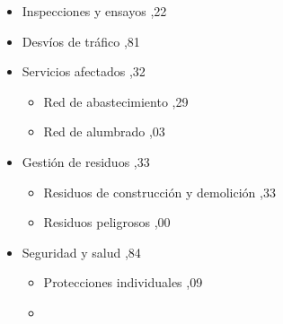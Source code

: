 \documentclass{book}%
\begin{document}
\begin{itemize}
\begin{itemize}
\begin{itemize}
\begin{itemize}
13.772,90%
\item%
Fase 4%
,75%
\end{itemize}%
\item%
Impermeabilización y adecuación del drenaje%
,18%
\begin{itemize}%
\item%
Fase 1%
,69%
\item%
Fase 2%
,03%
\item%
Fase 3%
,76%
\item%
Fase 4%
,70%
\end{itemize}%
\item%
Pavimentos y acabados%
,52%
\begin{itemize}%
\item%
Fase 1%
,71%
\item%
Fase 2%
,09%
\item%
Fase 3%
,97%
\item%
Fase 4%
,82%
\item%
Cuñas de transición%
,93%
\end{itemize}%
\item%
Marcas viales%
,19%
\end{itemize}%
\item%
Inspecciones y ensayos%
,22%
\item%
Desvíos de tráfico%
,81%
\item%
Servicios afectados%
,32%
\begin{itemize}%
\item%
Red de abastecimiento%
,29%
\item%
Red de alumbrado%
,03%
\end{itemize}%
\item%
Gestión de residuos%
,33%
\begin{itemize}%
\item%
Residuos de construcción y demolición%
,33%
\item%
Residuos peligrosos%
,00%
\end{itemize}%
\item%
Seguridad y salud%
,84%
\begin{itemize}%
\item%
Protecciones individuales%
,09%
\item%

\end{itemize}
\end{itemize}
\end{itemize}
\end{document}
